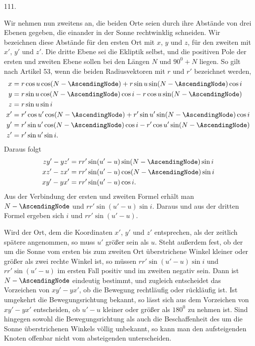 \par{}\medskip
\hypertarget{native-155-article111}{}
\begin{center}111.\end{center}
Wir nehmen nun zweitens an, die beiden Orte seien durch ihre Abstände von drei Ebenen gegeben, die einander in der Sonne rechtwinklig schneiden. Wir bezeichnen diese Abstände für den ersten Ort mit $x$, $y$ und $z$, für den zweiten mit $x'$, $y'$ und $z'$. Die dritte Ebene sei die Ekliptik selbst, und die positiven Pole der ersten und zweiten Ebene sollen bei den Längen $N$ und $90^0+N$ liegen. So gilt nach Artikel 53, wenn die beiden Radiusvektoren
mit $r$ und $r'$ bezeichnet werden,
\[
\begin{aligned}
x&=r\cos u\cos(N-\AscendingNode)+r\sin u\sin(N-\AscendingNode)\cos i\\
y&=r\sin u\cos(N-\AscendingNode)\cos i-r\cos u\sin(N-\AscendingNode)\\
z&=r\sin u\sin i\\
x'&=r'\cos u'\cos(N-\AscendingNode)+r'\sin u'\sin(N-\AscendingNode)\cos i\\
y'&=r'\sin u'\cos(N-\AscendingNode)\cos i-r'\cos u'\sin(N-\AscendingNode)\\
z'&=r'\sin u'\sin i.
\end{aligned}
\]
Daraus folgt
\[
\begin{aligned}
zy'-yz'&=rr'\sin(u'-u)\sin(N-\AscendingNode)\sin i\\
xz'-zx'&=rr'\sin(u'-u)\cos(N-\AscendingNode)\sin i\\
xy'-yx'&=rr'\sin(u'-u)\cos i.
\end{aligned}
\]
Aus der Verbindung der ersten und zweiten Formel erhält man $N-\AscendingNode$ und $rr'\sin(u'-u)\sin i$. Daraus und aus der dritten Formel ergeben sich $i$ und $rr'\sin(u'-u)$.

Wird der Ort, dem die Koordinaten $x'$, $y'$ und $z'$ entsprechen, als der zeitlich spätere angenommen, so muss $u'$ größer sein als $u$. Steht außerdem fest, ob der um die Sonne vom ersten bis zum zweiten Ort überstrichene Winkel kleiner oder größer als zwei rechte Winkel ist, so müssen $rr'\sin(u'-u)\sin i$ und $rr'\sin(u'-u)$ im ersten Fall positiv und im zweiten negativ sein. Dann ist $N-\AscendingNode$ eindeutig bestimmt, und zugleich entscheidet das Vorzeichen von $xy'-yx'$, ob die Bewegung rechtläufig oder rückläufig ist. Ist umgekehrt die Bewegungsrichtung bekannt, so lässt sich aus dem Vorzeichen von $xy'-yx'$ entscheiden, ob $u'-u$ kleiner oder größer als $180^0$ zu nehmen ist. Sind hingegen sowohl die Bewegungsrichtung als auch die Beschaffenheit des um die Sonne überstrichenen Winkels völlig unbekannt, so kann man den aufsteigenden Knoten offenbar nicht vom absteigenden unterscheiden.

